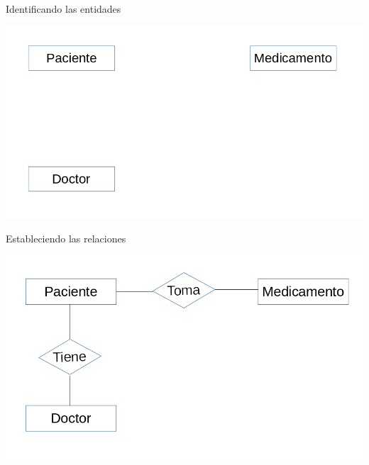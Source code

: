 \documentclass[11pt]{beamer}
\begin{document}
\begin{frame}{Identificando las entidades}

\begin{center}
\includegraphics[scale=.5]{images/1} 
\end{center}


\end{frame}

\begin{frame}{Estableciendo las relaciones}

\begin{center}
\includegraphics[scale=.5]{images/2} 
\end{center}

\end{frame}
\end{document}
